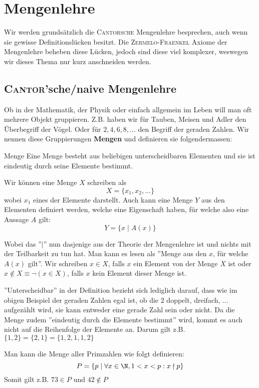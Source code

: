 \section{Mengenlehre} \label{cha_settheory}
Wir werden grundsätzlich die \textsc{Cantorsche} Mengenlehre besprechen, auch wenn sie gewisse Definitionslücken besitzt. Die \textsc{Zermelo-Fraenkel} Axiome der Mengenlehre beheben diese Lücken, jedoch sind diese viel komplexer, weswegen wir dieses Thema nur kurz anschneiden werden.

\subsection{\textsc{Cantor}'sche/naive Mengenlehre}
Ob in der Mathematik, der Physik oder einfach allgemein im Leben will man oft mehrere Objekt gruppieren. Z.B. haben wir für Tauben, Meisen und Adler den Überbegriff der Vögel. Oder für $2, 4, 6, 8, ...$ den Begriff der geraden Zahlen. Wir nennen diese Gruppierungen \textbf{Mengen} und definieren sie  folgendermassen:
\begin{definition}{Menge}{}
Eine Menge besteht aus beliebigen unterscheidbaren Elementen und sie ist eindeutig durch seine Elemente bestimmt.

Wir können eine Menge $X$ schreiben als $$X=\{x_1, x_2, ...\}$$ wobei $x_1$ eines der Elemente darstellt. Auch kann eine Menge $Y$ aus den Elementen definiert werden, welche eine Eigenschaft haben, für welche also eine Aussage $A$ gilt: $$Y=\{x \mid A(x)\}$$

Wobei das ''$\mid$'' nun dasjenige aus der Theorie der Mengenlehre ist und nichts mit der Teilbarkeit zu tun hat. Man kann es lesen als ''Menge aus den $x$, für welche $A(x)$ gilt''. Wir schreiben $x \in X$, falls $x$ ein Element von der Menge $X$ ist oder $x \notin X \equiv \neg (x \in X)$, falls $x$ kein Element dieser Menge ist.
\end{definition}
''Unterscheidbar'' in der Definition bezieht sich lediglich darauf, dass wie im obigen Beispiel der geraden Zahlen egal ist, ob die $2$ doppelt, dreifach, ... aufgezählt wird, sie kann entweder eine gerade Zahl sein oder nicht. Da die Menge zudem ''eindeutig durch die Elemente bestimmt'' wird, kommt es auch nicht auf die Reihenfolge der Elemente an. Darum gilt z.B. $\{1 ,2\} =\{2 ,1\} = \{1 ,2 ,1 ,1 , 2\}$

\begin{example}
Man kann die Menge aller Primzahlen wie folgt definieren: $$P = \{ p \mid \forall x \in \N, 1 < x < p: x \nmid p \}$$ Somit gilt z.B. $73 \in P$ und $42 \notin P$
\end{example}


